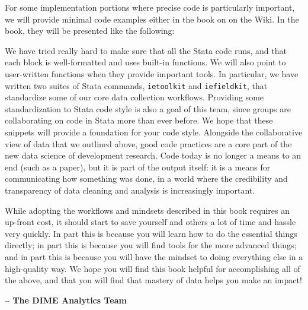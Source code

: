 For some implementation portions where precise code is particularly important,
we will provide minimal code examples either in the book on on the Wiki.
In the book, they will be presented like the following:


{
}

We have tried really hard to make sure that all the Stata code runs,
and that each block is well-formatted and uses built-in functions.
We will also point to user-written functions when they provide important tools.
In particular, we have written two suites of Stata commands,
\texttt{ietoolkit} and \texttt{iefieldkit},
that standardize some of our core data collection workflows.
Providing some standardization to Stata code style is also a goal of this team,
since groups are collaborating on code in Stata more than ever before.
We hope that these snippets will provide a foundation for your code style.
Alongside the collaborative view of data that we outlined above,
good code practices are a core part of the new data science of development research.
Code today is no longer a means to an end (such as a paper),
but it is part of the output itself: it is a means for communicating how something was done,
in a world where the credibility and transparency of data cleaning and analysis is increasingly important.

While adopting the workflows and mindsets described in this book
requires an up-front cost,
it should start to save yourself and others a lot of time and hassle very quickly.
In part this is because you will learn how to do the essential things directly;
in part this is because you will find tools for the more advanced things;
and in part this is because you will have the mindset to doing everything else in a high-quality way.
We hope you will find this book helpful for accomplishing all of the above,
and that you will find that mastery of data helps you make an impact!

\textbf{-- The DIME Analytics Team}

\mainmatter

